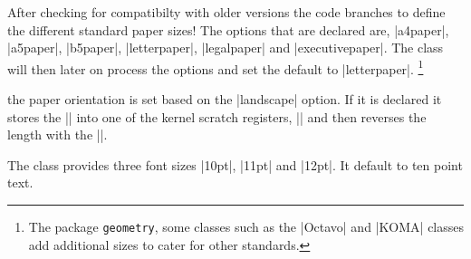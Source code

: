  After checking for compatibilty with older versions the code branches to define the different standard paper sizes! The options that are declared are, |a4paper|, |a5paper|, |b5paper|, |letterpaper|, |legalpaper| and  |executivepaper|. The class will then later on process the options and set the default to |letterpaper|. \footnote{The package \texttt{geometry}, some classes such as the |Octavo| and |KOMA| classes add additional sizes to cater for other standards.}

\begin{teX}
\if@compatibility\else
{}
   {\setlength\paperheight {297mm}%
    \setlength\paperwidth  {210mm}}
   {\setlength\paperheight {210mm}%
    \setlength\paperwidth  {148mm}}
   {\setlength\paperheight {250mm}%
    \setlength\paperwidth  {176mm}}
   {\setlength\paperheight {11in}%
    \setlength\paperwidth  {8.5in}}
   {\setlength\paperheight {14in}%
    \setlength\paperwidth  {8.5in}}
   {\setlength\paperheight {10.5in}%
    \setlength\paperwidth  {7.25in}}
\end{teX}

\begin{multicols}{2}
 the paper orientation is set based on the |landscape| option. If it is declared it stores the |\paperheight| into one of the \latex kernel scratch registers, |\@tempdima| and then reverses the length with the |\paperwidth|.
\end{multicols}

\begin{teX}
   {\setlength\@tempdima   {\paperheight}%
    \setlength\paperheight {\paperwidth}%
    \setlength\paperwidth  {\@tempdima}}
\fi
\end{teX}

\begin{multicols}{2}
 The class provides three font sizes |10pt|, |11pt| and |12pt|. It default to ten point text.
\end{multicols}

\begin{teX}
\if@compatibility
  \renewcommand\@ptsize{0}
\else
\DeclareOption{10pt}{\renewcommand\@ptsize{0}}
\fi
\DeclareOption{11pt}{\renewcommand\@ptsize{1}}
\DeclareOption{12pt}{\renewcommand\@ptsize{2}}
\end{teX}

